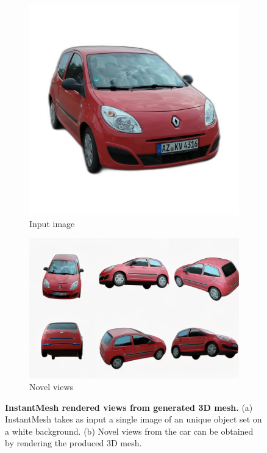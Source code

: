 \begin{figure}[htp!]
      \centering
      \begin{subfigure}{0.48\linewidth}
        \includegraphics[width=.7\linewidth]{images/introduction/input-instantmesh.png}
        \caption{Input image}
      \end{subfigure}
      \hfill
      \begin{subfigure}{0.48\linewidth}
        \includegraphics[width=\linewidth]{images/introduction/output-instantmesh.png}
        \caption{Novel views}
      \end{subfigure}
      \caption{\textbf{InstantMesh rendered views from generated 3D mesh.} (a) InstantMesh takes as input a single image of an unique object set on a white background. (b) Novel views from the car can be obtained by rendering the produced 3D mesh.}
    \label{fig:intro-instantmesh}
    \end{figure}


